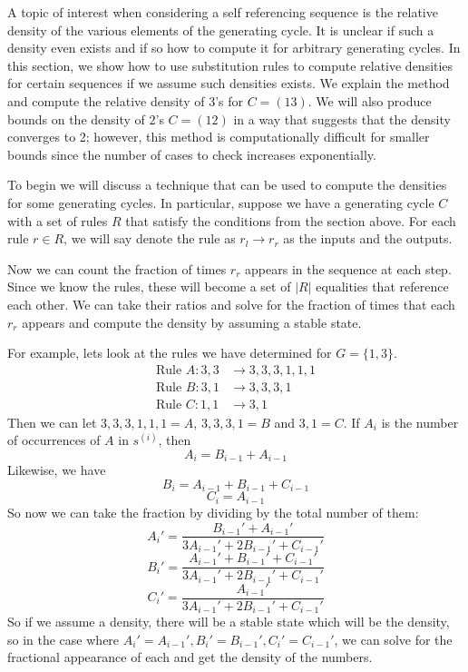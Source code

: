 \documentclass[runningheads,a4paper]{llncs}
\begin{document}
A topic of interest when considering a self referencing sequence is the relative density of the various elements of the generating cycle. It is unclear if such a density even exists and if so how to compute it for arbitrary generating cycles. In this section, we show how to use substitution rules to compute relative densities for certain sequences if we assume such densities exists. We explain the method and compute the relative density of 3's for $C = (1 3)$. We will also produce bounds on the density of $2$'s $C = (1 2)$ in a way that suggests that the density converges to 2; however, this method is computationally difficult for smaller bounds since the number of cases to check increases exponentially. 

To begin we will discuss a technique that can be used to compute the densities for some generating cycles. In particular, suppose we have a generating cycle $C$ with a set of rules $R$ that satisfy the conditions from the section above. For each rule $r \in R$, we will say denote the rule as $r_l \rightarrow r_r$ as the inputs and the outputs. 

Now we can count the fraction of times $r_r$ appears in the sequence at each step. Since we know the rules, these will become a set of $|R|$ equalities that reference each other. We can take their ratios and solve for the fraction of times that each $r_r$ appears and compute the density by assuming a stable state.

For example, lets look at the rules we have determined for $G = \{ 1, 3 \}$. 
\begin{align*}
\text{Rule }A: 3,3 &\to 3,3,3,1,1,1 \\
\text{Rule }B: 3,1 &\to 3,3,3,1\\
\text{Rule }C: 1,1 &\to 3,1
\end{align*}
Then we can let $3,3,3,1,1,1 = A$, $3,3,3,1 = B$ and $3, 1 = C$. If $A_i$ is the number of occurrences of $A$ in $s^{(i)}$, then 
\[ A_i = B_{i-1} + A_{i-1} \]
Likewise, we have
\[ B_i = A_{i-1} + B_{i-1} + C_{i-1} \]
\[ C_i = A_{i-1} \]
So now we can take the fraction by dividing by the total number of them:
\[ A_i' = \dfrac{B_{i-1}' + A_{i-1}'}{3A_{i-1}' + 2B_{i-1}' + C_{i-1}'} \]
\[ B_i' = \dfrac{A_{i-1}' + B_{i-1}' + C_{i-1}'}{3A_{i-1}' + 2B_{i-1}' + C_{i-1}'} \]
\[ C_i' = \dfrac{A_{i-1}'}{3A_{i-1}' + 2B_{i-1}' + C_{i-1}'} \]
So if we assume a density, there will be a stable state which will be the density, so in the case where $A_i'=A_{i-1}', B_i' = B_{i-1}', C_i'=C_{i-1}'$, we can solve for the fractional appearance of each and get the density of the numbers.
\end{document}

